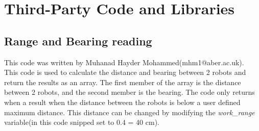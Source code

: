 \chapter{Third-Party Code and Libraries}

\section{Range and Bearing reading}
\label{code:erandB}
This code was written by Muhanad Hayder Mohammed(mhm1@aber.ac.uk).\\
This code is used to calculate the distance and bearing between 2 robots and return the results as an array. The first member of the array is the distance between 2 robots, and the second member is the bearing. 
The code only returns when a result when the distance between the robots is below a user defined maximum distance. This distance can be changed by modifying the \textit{work\_range} variable(in this code snipped set to 0.4 = 40 cm).
